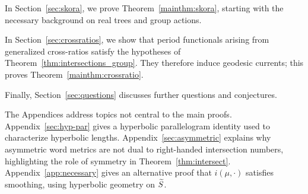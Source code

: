In Section~\ref{sec:skora}, we prove Theorem~\ref{mainthm:skora},
starting with the necessary background on real trees and group actions.

In Section~\ref{sec:crossratios}, we show that period functionals
arising from generalized cross-ratios satisfy the hypotheses of
Theorem~\ref{thm:intersections_group}. They therefore induce geodesic
currents; this proves Theorem~\ref{mainthm:crossratio}.

Finally, Section~\ref{sec:questions} discusses further questions and conjectures.

The Appendices address topics not central to the main proofs. Appendix~\ref{sec:hyp-par} gives a hyperbolic
parallelogram identity used to characterize hyperbolic lengths.
Appendix~\ref{sec:asymmetric} explains why asymmetric word metrics are
not dual to right-handed intersection numbers, highlighting the role
of symmetry in Theorem~\ref{thm:intersect}.
Appendix~\ref{app:necessary} gives an alternative proof
that $i(\mu,\cdot)$ satisfies smoothing, using hyperbolic geometry on $\widetilde{S}$.

